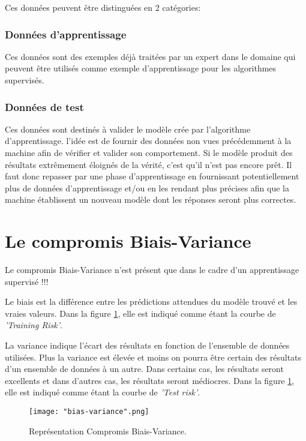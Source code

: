 \documentclass[a4paper]{article}
\begin{document}
Ces données peuvent être distinguées en 2 catégories:

\subsubsection{Données d'apprentissage}
Ces données sont des exemples déjà traitées par un expert dans le domaine qui peuvent être utilisés comme exemple d'apprentissage pour les algorithmes supervisés.

\subsubsection{Données de test}
Ces données sont destinés à valider le modèle crée par l'algorithme d'apprentissage. l'idée est de fournir des données non vues précédemment à la machine afin de vérifier et valider son comportement. Si le modèle produit des résultats extrêmement éloignés de la vérité, c'est qu'il n'est pas encore prêt. Il faut donc repasser par une phase d'apprentissage en fournissant potentiellement plus de données d'apprentissage et/ou en les rendant plus précises afin que la machine établissent un nouveau modèle dont les réponses seront plus correctes.

\newpage

\section{Le compromis Biais-Variance}
\label{B-V}
Le compromis Biais-Variance n'est présent que dans le cadre d'un apprentissage supervisé !!!

Le biais est la différence entre les prédictions attendues du modèle trouvé et les vraies valeurs. Dans la figure \ref{Bias-Variance}, elle est indiqué comme étant la courbe de \textit{'Training Risk'}.   \newline

La variance indique l'écart des résultats en fonction de l'ensemble de données utilisées. Plus la variance est élevée et moins on pourra être certain des résultats d'un ensemble de données à un autre. Dans certains cas, les résultats seront excellents et dans d'autres cas, les résultats seront médiocres. Dans la figure \ref{Bias-Variance}, elle est indiqué comme étant la courbe de \textit{'Test risk'}. \newline

\begin{figure}[!h]
	\centering
	\texttt{[image: "bias-variance".png]}
	\caption{Représentation Compromis Biais-Variance. \cite{ReconcilingModernML}}
	\label{Bias-Variance}
\end{figure}
\end{document}
